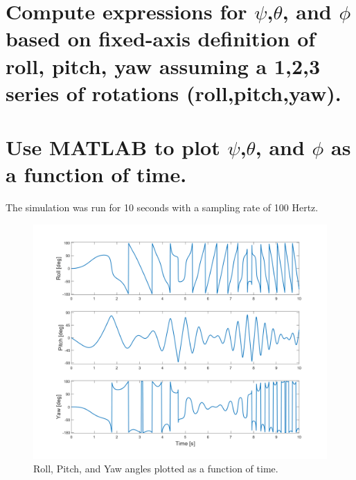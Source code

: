 \documentclass[12pt,letterpaper, onecolumn]{exam}
\begin{document}
\begin{questions}
\begin{parts}
        \part{Compute expressions for $\psi$,$\theta$, and $\phi$ based on fixed-axis definition of roll, pitch, yaw assuming a 1,2,3 series of rotations (roll,pitch,yaw).}


        \part{Use MATLAB to plot $\psi$,$\theta$, and $\phi$ as a function of time.}

        The simulation was run for 10 seconds with a sampling rate of 100 Hertz.

        \begin{figure}[!h]
            \centering
            \includegraphics[width=0.8\linewidth]{Euler_Angles.png}
            \caption{Roll, Pitch, and Yaw angles plotted as a function of time.}
            \label{fig:euler}
        \end{figure}


\end{parts}
\end{questions}
\end{document}
